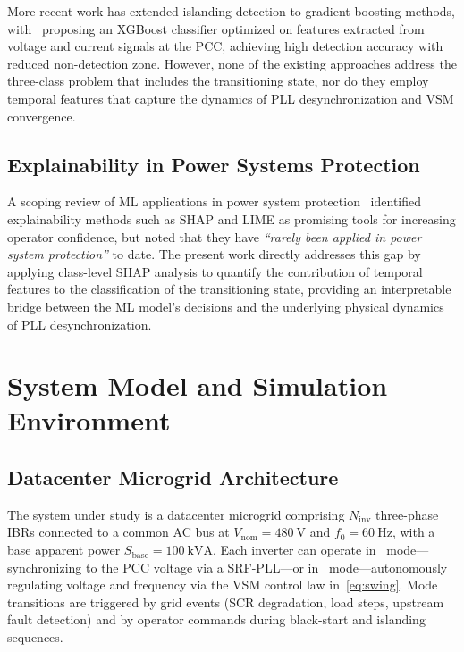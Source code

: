 \documentclass[journal]{IEEEtran}
\newcommand{\gfl}{\text{GFL}}
\newcommand{\gfm}{\text{GFM}}
\begin{document}
More recent work has extended islanding detection to gradient boosting
methods, with~\cite{b_xgb_islanding} proposing an XGBoost classifier
optimized on features extracted from voltage and current signals at the
PCC, achieving high detection accuracy with reduced non-detection zone.
However, none of the existing approaches address the three-class
problem that includes the transitioning state, nor do they employ
temporal features that capture the dynamics of PLL desynchronization
and VSM convergence.

\subsection{Explainability in Power Systems Protection}

A scoping review of ML applications in power system
protection~\cite{b_scoping} identified explainability methods such
as SHAP and LIME as promising tools for increasing operator confidence,
but noted that they have \textit{``rarely been applied in power system
protection''} to date.
The present work directly addresses this gap by applying class-level
SHAP analysis to quantify the contribution of temporal features to
the classification of the transitioning state, providing an
interpretable bridge between the ML model's decisions and the
underlying physical dynamics of PLL desynchronization.

\section{System Model and Simulation Environment}
\label{sec:system}

\subsection{Datacenter Microgrid Architecture}

The system under study is a datacenter microgrid comprising $N_\text{inv}$
three-phase IBRs connected to a common AC bus at $V_\text{nom} = \SI{480}{\volt}$
and $f_0 = \SI{60}{\hertz}$, with a base apparent power $S_\text{base} = \SI{100}{\kilo\volt\ampere}$.
Each inverter can operate in \gfl\ mode---synchronizing to the PCC
voltage via a SRF-PLL---or in \gfm\ mode---autonomously regulating
voltage and frequency via the VSM control law in~\eqref{eq:swing}.
Mode transitions are triggered by grid events (SCR degradation,
load steps, upstream fault detection) and by operator commands during
black-start and islanding sequences.
\end{document}
